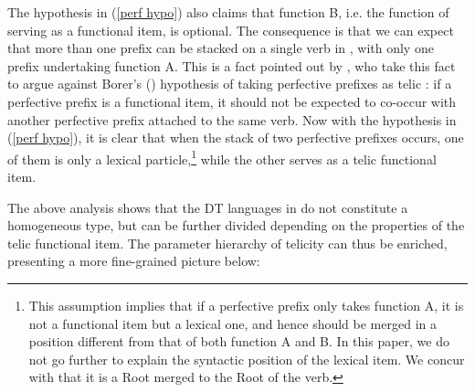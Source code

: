 \documentclass[output=paper]{langsci/langscibook}
\begin{document}
The hypothesis in (\ref{perf hypo}) also claims that function B, i.e. the
function of serving as a functional item, is optional. The consequence is that
we can expect that more than one prefix can be stacked on a single verb in
, with only one prefix undertaking function A. This is a fact
pointed out by \textcite{filiprothstein2005}, who take this fact to argue
against Borer's (\citeyear{Borer2005b}) hypothesis of taking perfective
prefixes as telic : if a perfective prefix is a
functional item, it should not be expected to co-occur with another perfective
prefix attached to the same verb. Now with the hypothesis in (\ref{perf hypo}),
it is clear that when the stack of two perfective prefixes occurs, one of them
is only a lexical particle,\footnote{This assumption implies that if a
perfective prefix only takes function A, it is not a functional item but a
lexical one, and hence should be merged in a position different from that of
both function A and B. In this paper, we do not go further to explain the
syntactic position of the lexical item. We concur with
\textcite{basilico2008syntactic} that it is a Root merged to the Root of the
verb.} while the other serves as a telic functional item.

The above analysis shows that the DT languages in  do not constitute a
homogeneous type, but can be further divided depending on the properties of the
telic functional item. The parameter hierarchy of
telicity can thus be enriched, presenting a more fine-grained picture
below:\largerpage[-1]\pagebreak
\end{document}
